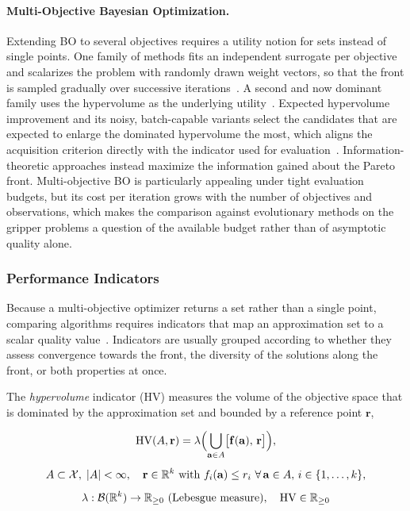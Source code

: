 \paragraph{Multi-Objective Bayesian Optimization.}
Extending BO to several objectives requires a utility notion for sets instead of single points. One family of methods fits an independent surrogate
per objective and scalarizes the problem with randomly drawn weight vectors, so that the front is sampled gradually over successive
iterations~\cite{Ament2023Unexpected}. A second and now dominant family uses the hypervolume as the underlying utility~\cite{Tu2022Joint}. Expected
hypervolume improvement and its noisy, batch-capable variants select the candidates that are expected to enlarge the dominated hypervolume the most,
which aligns the acquisition criterion directly with the indicator used for evaluation~\cite{Ament2023Unexpected}. Information-theoretic approaches
instead maximize the information gained about the Pareto front. Multi-objective BO is particularly appealing under tight evaluation budgets, but its
cost per iteration grows with the number of objectives and observations, which makes the comparison against evolutionary methods on the gripper
problems a question of the available budget rather than of asymptotic quality alone.

\subsubsection{Performance Indicators}
\label{subsubsec:performance_indicators}

Because a multi-objective optimizer returns a set rather than a single point, comparing algorithms requires indicators that map an approximation set
to a scalar quality value~\cite{Guerreiro2020}. Indicators are usually grouped according to whether they assess convergence towards the front, the
diversity of the solutions along the front, or both properties at once.

The \emph{hypervolume} indicator (HV) measures the volume of the objective space that is dominated by the approximation set and bounded by a reference
point $\mathbf{r}$,

\begin{equation}
    \begin{gathered}
        \mathrm{HV}(A, \mathbf{r}) =
        \lambda \Bigl(
            \bigcup_{\mathbf{a} \in A}
            \bigl[\mathbf{f}(\mathbf{a}),\, \mathbf{r}\bigr]
        \Bigr), \\[4pt]
        A \subset \mathcal{X},\; |A| < \infty,\quad
        \mathbf{r} \in \mathbb{R}^{k} \ \text{with} \ f_i(\mathbf{a}) \leq r_i \ \forall\, \mathbf{a} \in A,\, i \in \{1,\ldots,k\}, \\[4pt]
        \lambda : \mathcal{B}(\mathbb{R}^{k}) \rightarrow \mathbb{R}_{\geq 0} \ \text{(Lebesgue measure)},\quad
        \mathrm{HV} \in \mathbb{R}_{\geq 0}
    \end{gathered}
\end{equation}

